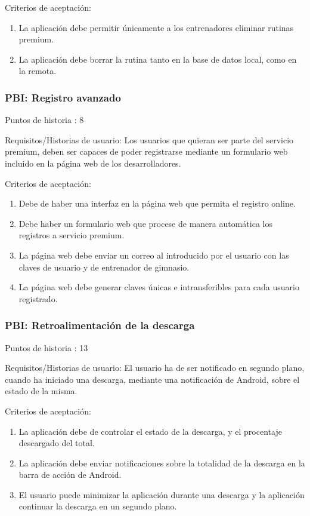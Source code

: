 \documentclass[11pt,a4paper]{report}
\begin{document}
Criterios de aceptación:
\begin{enumerate}
	\item La aplicación debe permitir únicamente a los entrenadores eliminar rutinas premium.
	
	\item La aplicación debe borrar la rutina tanto en la base de datos local, como en la remota.
	
\end{enumerate}
\subsubsection{PBI: Registro avanzado}
Puntos de historia : 8

Requisitos/Historias de usuario: Los usuarios que quieran ser parte del servicio premium, deben ser capaces de poder registrarse mediante un formulario web incluido en la página web de los desarrolladores.

Criterios de aceptación:
\begin{enumerate}
	\item Debe de haber una interfaz en la página web que permita el registro online.
	
	\item Debe haber un formulario web que procese de manera automática los registros a servicio premium.
	
	\item La página web debe enviar un correo al introducido por el usuario con las claves de usuario y de entrenador de gimnasio.
	
	\item La página web debe generar claves únicas e intransferibles para cada usuario registrado.
	
\end{enumerate}
\subsubsection{PBI: Retroalimentación de la descarga} 

Puntos de historia : 13

Requisitos/Historias de usuario: El usuario ha de ser notificado en segundo plano, cuando ha iniciado una descarga, mediante una notificación de Android, sobre el estado de la misma.

Criterios de aceptación:
\begin{enumerate}
	\item La aplicación debe de controlar el estado de la descarga, y el procentaje descargado del total.
	
	\item La aplicación debe enviar notificaciones sobre la totalidad de la descarga en la barra de acción de Android.
	
	\item El usuario puede minimizar la aplicación durante una descarga y la aplicación continuar la descarga en un segundo plano.
\end{enumerate}
\end{document}
